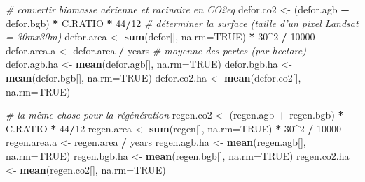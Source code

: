 \documentclass[a4paper, notitlepage, 12pt, krantz2]{krantz}
\newenvironment{Shaded}{\begin{snugshade}}{\end{snugshade}}
\newcommand{\CommentTok}[1]{\textcolor[rgb]{0.56,0.35,0.01}{\textit{#1}}}
\newcommand{\DataTypeTok}[1]{\textcolor[rgb]{0.13,0.29,0.53}{#1}}
\newcommand{\DecValTok}[1]{\textcolor[rgb]{0.00,0.00,0.81}{#1}}
\newcommand{\KeywordTok}[1]{\textcolor[rgb]{0.13,0.29,0.53}{\textbf{#1}}}
\newcommand{\NormalTok}[1]{#1}
\newcommand{\OperatorTok}[1]{\textcolor[rgb]{0.81,0.36,0.00}{\textbf{#1}}}
\newcommand{\OtherTok}[1]{\textcolor[rgb]{0.56,0.35,0.01}{#1}}
\newcommand{\StringTok}[1]{\textcolor[rgb]{0.31,0.60,0.02}{#1}}
\begin{document}
\begin{Shaded}
\begin{Highlighting}[]
{  \CommentTok{# convertir biomasse aérienne et racinaire en CO2eq}
\NormalTok{  defor.co2    <-}\StringTok{ }\NormalTok{(defor.agb }\OperatorTok{+}\StringTok{ }\NormalTok{defor.bgb) }\OperatorTok{*}\StringTok{ }\NormalTok{C.RATIO }\OperatorTok{*}\StringTok{ }\DecValTok{44}\OperatorTok{/}\DecValTok{12}
  \CommentTok{# déterminer la surface (taille d'un pixel Landsat = 30mx30m)}
\NormalTok{  defor.area   <-}\StringTok{ }\KeywordTok{sum}\NormalTok{(defor[], }\DataTypeTok{na.rm=}\OtherTok{TRUE}\NormalTok{) }\OperatorTok{*}\StringTok{ }\DecValTok{30}\OperatorTok{^}\DecValTok{2} \OperatorTok{/}\StringTok{ }\DecValTok{10000}
\NormalTok{  defor.area.a <-}\StringTok{ }\NormalTok{defor.area }\OperatorTok{/}\StringTok{ }\NormalTok{years}
  \CommentTok{# moyenne des pertes (par hectare)}
\NormalTok{  defor.agb.ha <-}\StringTok{ }\KeywordTok{mean}\NormalTok{(defor.agb[], }\DataTypeTok{na.rm=}\OtherTok{TRUE}\NormalTok{)}
\NormalTok{  defor.bgb.ha <-}\StringTok{ }\KeywordTok{mean}\NormalTok{(defor.bgb[], }\DataTypeTok{na.rm=}\OtherTok{TRUE}\NormalTok{)}
\NormalTok{  defor.co2.ha <-}\StringTok{ }\KeywordTok{mean}\NormalTok{(defor.co2[], }\DataTypeTok{na.rm=}\OtherTok{TRUE}\NormalTok{)}
  
  \CommentTok{# la même chose pour la régénération}
\NormalTok{  regen.co2    <-}\StringTok{ }\NormalTok{(regen.agb }\OperatorTok{+}\StringTok{ }\NormalTok{regen.bgb) }\OperatorTok{*}\StringTok{ }\NormalTok{C.RATIO }\OperatorTok{*}\StringTok{ }\DecValTok{44}\OperatorTok{/}\DecValTok{12}
\NormalTok{  regen.area   <-}\StringTok{ }\KeywordTok{sum}\NormalTok{(regen[], }\DataTypeTok{na.rm=}\OtherTok{TRUE}\NormalTok{) }\OperatorTok{*}\StringTok{ }\DecValTok{30}\OperatorTok{^}\DecValTok{2} \OperatorTok{/}\StringTok{ }\DecValTok{10000}
\NormalTok{  regen.area.a <-}\StringTok{ }\NormalTok{regen.area }\OperatorTok{/}\StringTok{ }\NormalTok{years}
\NormalTok{  regen.agb.ha <-}\StringTok{ }\KeywordTok{mean}\NormalTok{(regen.agb[], }\DataTypeTok{na.rm=}\OtherTok{TRUE}\NormalTok{)}
\NormalTok{  regen.bgb.ha <-}\StringTok{ }\KeywordTok{mean}\NormalTok{(regen.bgb[], }\DataTypeTok{na.rm=}\OtherTok{TRUE}\NormalTok{)}
\NormalTok{  regen.co2.ha <-}\StringTok{ }\KeywordTok{mean}\NormalTok{(regen.co2[], }\DataTypeTok{na.rm=}\OtherTok{TRUE}\NormalTok{)}
  
}
\end{Highlighting}
\end{Shaded}
\end{document}
